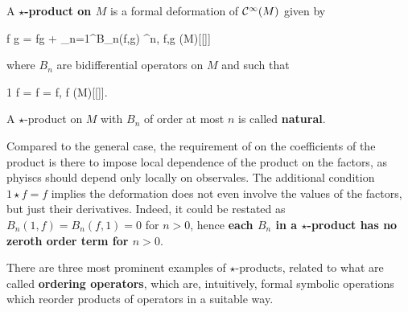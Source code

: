 \documentclass[main.tex]{subfiles}
\begin{document}
\begin{definition}
	A \textbf{$\star$-product on $M$} is a formal deformation of $\mathcal{C}^\infty(M)$ given by
	\begin{eqalign}
		f \star g = fg + \sum_{n=1}^\infty B_n(f,g) \planck^n, \quad f,g \in \Cinfty(M)[[\planck]]
	\end{eqalign}
	where $B_n$ are bidifferential operators on $M$ and such that
	\begin{eqalign}
	\label{eq:star_pr_id_axiom}
		1 \star f = f  = f, \quad \forall f \in \Cinfty(M)[[\planck]].
	\end{eqalign}
	A $\star$-product on $M$ with $B_n$ of order at most $n$ is called \textbf{natural}.
\end{definition}

\begin{remark}
\label{rmk:no_zeroth_order}
	Compared to the general case, the requirement of on the coefficients of the product is there to impose local dependence of the product on the factors, as phyiscs should depend only locally on observales. The additional condition $1 \star f=f$ implies the deformation does not even involve the values of the factors, but just their derivatives. Indeed, it could be restated as $B_n(1,f) = B_n(f,1) =0$ for $n>0$, hence \textbf{each $B_n$ in a $\star$-product has no zeroth order term for $n > 0$}.
\end{remark}

There are three most prominent examples of $\star$-products, related to what are called \textbf{ordering operators}, which are, intuitively, formal symbolic operations which reorder products of operators in a suitable way.
\end{document}
